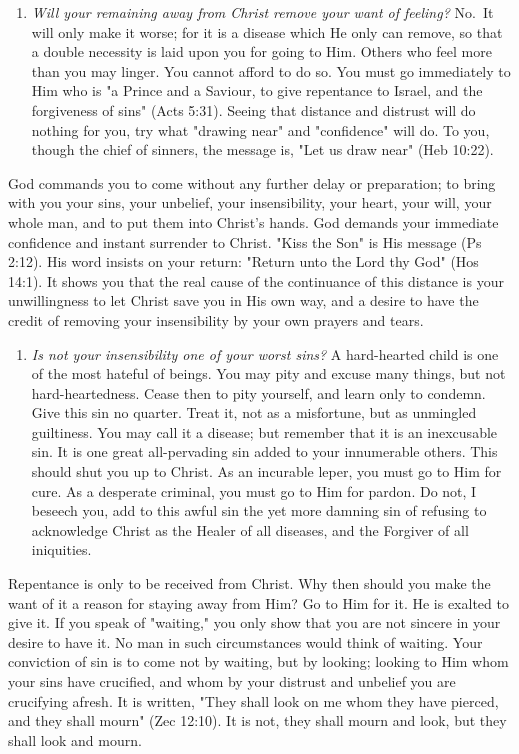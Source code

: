 \documentclass[
]{book}
\providecommand{\tightlist}{%
  \setlength{\itemsep}{0pt}\setlength{\parskip}{0pt}}
\begin{document}
\begin{enumerate}
\item
  \emph{Will your remaining away from Christ remove your want of feeling?} No.~It will only make it worse; for it is a disease which He only can remove, so that a double necessity is laid upon you for going to Him. Others who feel more than you may linger. You cannot afford to do so. You must go immediately to Him who is "a Prince and a Saviour, to give repentance to Israel, and the forgiveness of sins" (Acts 5:31). Seeing that distance and distrust will do nothing for you, try what "drawing near" and "confidence" will do. To you, though the chief of sinners, the message is, "Let us draw near" (Heb 10:22).
\end{enumerate}

God commands you to come without any further delay or preparation; to bring with you your sins, your unbelief, your insensibility, your heart, your will, your whole man, and to put them into Christ's hands. God demands your immediate confidence and instant surrender to Christ. "Kiss the Son" is His message (Ps 2:12). His word insists on your return: "Return unto the Lord thy God" (Hos 14:1). It shows you that the real cause of the continuance of this distance is your unwillingness to let Christ save you in His own way, and a desire to have the credit of removing your insensibility by your own prayers and tears.

\begin{enumerate}
\def\labelenumi{\arabic{enumi}.}
\setcounter{enumi}{5}
\tightlist
\item
  \emph{Is not your insensibility one of your worst sins?} A hard-hearted child is one of the most hateful of beings. You may pity and excuse many things, but not hard-heartedness. Cease then to pity yourself, and learn only to condemn. Give this sin no quarter. Treat it, not as a misfortune, but as unmingled guiltiness. You may call it a disease; but remember that it is an inexcusable sin. It is one great all-pervading sin added to your innumerable others. This should shut you up to Christ. As an incurable leper, you must go to Him for cure. As a desperate criminal, you must go to Him for pardon. Do not, I beseech you, add to this awful sin the yet more damning sin of refusing to acknowledge Christ as the Healer of all diseases, and the Forgiver of all iniquities.
\end{enumerate}

Repentance is only to be received from Christ. Why then should you make the want of it a reason for staying away from Him? Go to Him for it. He is exalted to give it. If you speak of "waiting," you only show that you are not sincere in your desire to have it. No man in such circumstances would think of waiting. Your conviction of sin is to come not by waiting, but by looking; looking to Him whom your sins have crucified, and whom by your distrust and unbelief you are crucifying afresh. It is written, "They shall look on me whom they have pierced, and they shall mourn" (Zec 12:10). It is not, they shall mourn and look, but they shall look and mourn.
\end{document}
